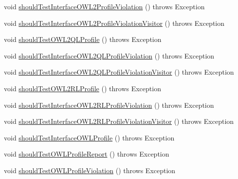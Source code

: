 \begin{DoxyCompactItemize}
\item 
void \hyperlink{classorg_1_1semanticweb_1_1owlapi_1_1contract_1_1_contract_owlapi_profiles_test_adee6dd91ffa1e1168f306543a3198232}{should\-Test\-Interface\-O\-W\-L2\-Profile\-Violation} ()  throws Exception 
\item 
void \hyperlink{classorg_1_1semanticweb_1_1owlapi_1_1contract_1_1_contract_owlapi_profiles_test_a1d521b031f2c8f663d273d774907d97e}{should\-Test\-Interface\-O\-W\-L2\-Profile\-Violation\-Visitor} ()  throws Exception 
\item 
void \hyperlink{classorg_1_1semanticweb_1_1owlapi_1_1contract_1_1_contract_owlapi_profiles_test_a66eb42e4be86fcf882b46bb13670ef0d}{should\-Test\-O\-W\-L2\-Q\-L\-Profile} ()  throws Exception 
\item 
void \hyperlink{classorg_1_1semanticweb_1_1owlapi_1_1contract_1_1_contract_owlapi_profiles_test_ac50b13b4865588558ca24894cfa941b3}{should\-Test\-Interface\-O\-W\-L2\-Q\-L\-Profile\-Violation} ()  throws Exception 
\item 
void \hyperlink{classorg_1_1semanticweb_1_1owlapi_1_1contract_1_1_contract_owlapi_profiles_test_adad1bb4beafc360a7880552d8566612e}{should\-Test\-Interface\-O\-W\-L2\-Q\-L\-Profile\-Violation\-Visitor} ()  throws Exception 
\item 
void \hyperlink{classorg_1_1semanticweb_1_1owlapi_1_1contract_1_1_contract_owlapi_profiles_test_a368c1b348e15797764b7ec786901b9af}{should\-Test\-O\-W\-L2\-R\-L\-Profile} ()  throws Exception 
\item 
void \hyperlink{classorg_1_1semanticweb_1_1owlapi_1_1contract_1_1_contract_owlapi_profiles_test_ae75a23e0a84e9a0809d00f646866e2cf}{should\-Test\-Interface\-O\-W\-L2\-R\-L\-Profile\-Violation} ()  throws Exception 
\item 
void \hyperlink{classorg_1_1semanticweb_1_1owlapi_1_1contract_1_1_contract_owlapi_profiles_test_a80c9e2dc1ca99833bb4c8e346ab38b83}{should\-Test\-Interface\-O\-W\-L2\-R\-L\-Profile\-Violation\-Visitor} ()  throws Exception 
\item 
void \hyperlink{classorg_1_1semanticweb_1_1owlapi_1_1contract_1_1_contract_owlapi_profiles_test_a57aeff634d9113085c24a5bced120997}{should\-Test\-Interface\-O\-W\-L\-Profile} ()  throws Exception 
\item 
void \hyperlink{classorg_1_1semanticweb_1_1owlapi_1_1contract_1_1_contract_owlapi_profiles_test_a6ff83bf9c3e7985e273ea6ece7e81a2e}{should\-Test\-O\-W\-L\-Profile\-Report} ()  throws Exception 
\item 
void \hyperlink{classorg_1_1semanticweb_1_1owlapi_1_1contract_1_1_contract_owlapi_profiles_test_a69ccdcba5c6634196ba71a73dd1f0642}{should\-Test\-O\-W\-L\-Profile\-Violation} ()  throws Exception 

\end{DoxyCompactItemize}
